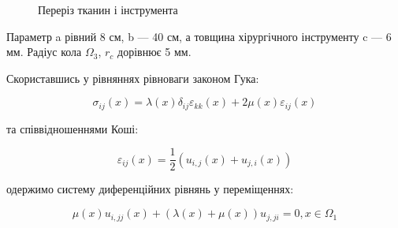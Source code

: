 \begin{figure}[ht!]
    \centering
    
    \caption{Переріз тканин і інструмента}
    \label{fig:elasticity_2d_domain}
\end{figure}

\noindent Параметр a рівний 8 см, b --- 40 см, а товщина хірургічного інструменту c --- 6 мм. Радіус кола $\Omega_3$, 
$r_c$ дорівнює 5 мм.

Скориставшись у рівняннях рівноваги законом Гука:

\begin{equation}
    \label{eqn:elasticity_hooke_law}
    \sigma_{ij}(x) = \lambda(x)\delta_{ij}\varepsilon_{kk}(x) + 2\mu(x)\varepsilon_{ij}(x)
\end{equation}

\noindent та співвідношеннями Коші:

\begin{equation}
    \label{eqn:elasticity_gauchy_tensor}
    \varepsilon_{ij}(x) = \frac{1}{2}(u_{i,j}(x) + u_{j,i}(x))
\end{equation}

\noindent одержимо систему диференційних рівнянь у переміщеннях:

\begin{equation}
    \label{eqn:elasticity_2d_eqn}
    \mu(x)u_{i,jj}(x) + (\lambda(x) + \mu(x))u_{j,ji} = 0, x \in \Omega_1
\end{equation}


